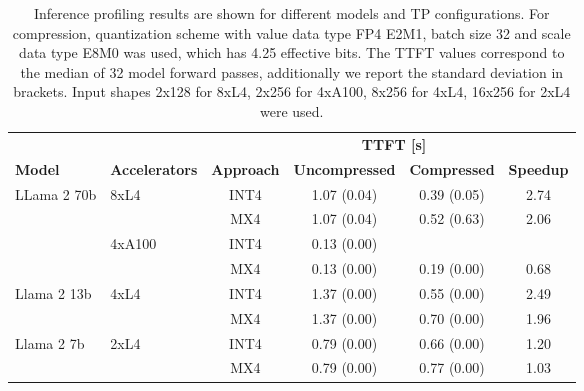 \begin{table}[h]
\centering
\begin{tabular}{llcccc}
\toprule
                &                   &                   & \multicolumn{2}{c}{\textbf{TTFT [s]}}                         &  \\ 
\textbf{Model}  & \textbf{Accelerators} & \textbf{Approach}    & \textbf{Uncompressed} & \textbf{Compressed}    & \textbf{Speedup} \\ 
\midrule
\multirow{4}{*}{LLama 2 70b}  & \multirow{2}{*}{8xL4} & INT4 & 1.07 (0.04) & 0.39 (0.05) & 2.74 \\ 
                            &                                   & MX4 & 1.07 (0.04) & 0.52 (0.63) & 2.06 \\ \cmidrule{2-6}
                            & \multirow{2}{*}{4xA100} & INT4 & 0.13 (0.00) & &\\ 
                            &                                   & MX4 & 0.13 (0.00) & 0.19 (0.00) & 0.68 \\ \midrule
\multirow{2}{*}{Llama 2 13b}  & \multirow{2}{*}{4xL4} & INT4 & 1.37 (0.00) & 0.55 (0.00) & 2.49 \\ 
                            &                                   & MX4 & 1.37 (0.00) & 0.70 (0.00) & 1.96 \\ 
                            \midrule
\multirow{2}{*}{Llama 2 7b}   & \multirow{2}{*}{2xL4} & INT4 & 0.79 (0.00) & 0.66 (0.00) & 1.20 \\ 
                            &                                   & MX4 & 0.79 (0.00) & 0.77 (0.00) & 1.03 \\ 
\bottomrule
\end{tabular}
\caption{Inference profiling results are shown for different models and TP configurations. For compression, quantization scheme with value data type FP4 E2M1, batch size 32 and scale data type E8M0 was used, which has 4.25 effective bits. The TTFT values correspond to the median of 32 model forward passes, additionally we report the standard deviation in brackets. Input shapes 2x128 for 8xL4, 2x256 for 4xA100, 8x256 for 4xL4, 16x256 for 2xL4 were used.}
\label{table:profiling}
\end{table}
